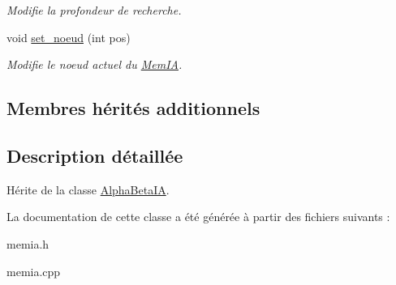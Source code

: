 \begin{DoxyCompactItemize}
\begin{DoxyCompactList}\small\item\em Modifie la profondeur de recherche. \end{DoxyCompactList}\item 
void \hyperlink{classMemIA_a4efede59191924b76042bbc45860efc6}{set\+\_\+noeud} (int pos)\hypertarget{classMemIA_a4efede59191924b76042bbc45860efc6}{}\label{classMemIA_a4efede59191924b76042bbc45860efc6}

\begin{DoxyCompactList}\small\item\em Modifie le noeud actuel du \hyperlink{classMemIA}{Mem\+IA}. \end{DoxyCompactList}\end{DoxyCompactItemize}
\subsection*{Membres hérités additionnels}


\subsection{Description détaillée}
Hérite de la classe \hyperlink{classAlphaBetaIA}{Alpha\+Beta\+IA}. 

La documentation de cette classe a été générée à partir des fichiers suivants \+:\begin{DoxyCompactItemize}
\item 
memia.\+h\item 
memia.\+cpp\end{DoxyCompactItemize}
